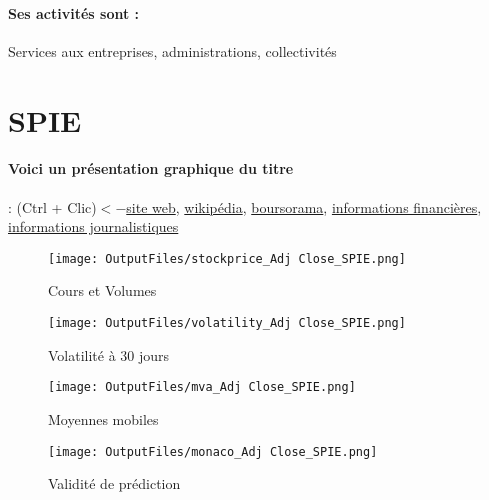 \documentclass[11pt,a4paper]{report}%
\begin{document}
\paragraph{Ses activités sont : } Services aux entreprises, administrations, collectivités  
    
    \newpage

\section{SPIE}

\paragraph{Voici un présentation graphique du titre} : (Ctrl + Clic)$<-$\href{https://www.sodexo.com/fr/home/finance.html}{site web}, \href{https://fr.wikipedia.org/wiki/Spie}{wikipédia}, \href{https://www.boursorama.com/cours/1rPSPIE}{boursorama}, \href{https://www.qwant.com/?q=site:https:%2f%2fwww.easybourse.com%2faction-societe%2fSPIE&t=web&client=ext-firefox-hp}{informations financières}, \href{https://bourse.lerevenu.com/cours-de-bourse/fiche-valeur-synthese/SPIE/SPIE-FR}{informations journalistiques}
\begin{figure}[!htb]
   \begin{minipage}{0.5\textwidth}
     \centering
     \texttt{[image: OutputFiles/stockprice\_Adj Close\_SPIE.png]}
     \caption{Cours et Volumes}\label{Fig:price_SPIE}
   \end{minipage}\hfill
   \begin{minipage}{0.5\textwidth}
     \centering
     \texttt{[image: OutputFiles/volatility\_Adj Close\_SPIE.png]}
     \caption{Volatilité à 30 jours}\label{Fig:volat_SPIE}
   \end{minipage}
\end{figure}
\begin{figure}[!htb]
   \begin{minipage}{0.5\textwidth}
     \centering
     \texttt{[image: OutputFiles/mva\_Adj Close\_SPIE.png]}
     \caption{Moyennes mobiles}\label{Fig:mva_SPIE}
   \end{minipage}\hfill
   \begin{minipage}{0.5\textwidth}
     \centering
     \texttt{[image: OutputFiles/monaco\_Adj Close\_SPIE.png]}
     \caption{Validité de prédiction}\label{Fig:prediction_SPIE}
   \end{minipage}
\end{figure}
\end{document}
